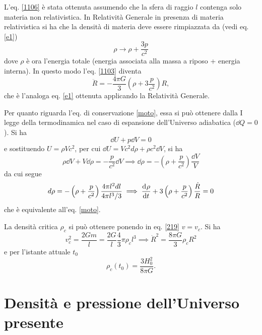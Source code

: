 L'eq. \eqref{1106} è stata ottenuta assumendo che la sfera di raggio $l$
contenga solo materia non relativistica.  In Relatività Generale in presenza di
materia relativistica si ha che la densità di materia deve essere rimpiazzata da
(vedi eq. \eqref{e1})
\begin{equation}
  \rho \to  \rho + \frac{3 p}{c^2}
\end{equation}
dove $\rho$ è ora l'energia totale (energia associata alla massa a riposo +
energia interna).  In questo modo l'eq. \eqref{1103} diventa
\begin{equation}
  \ddot R = - \frac{4 \pi G }{3} \left( \rho + 3 \frac{p}{c^2} \right) R,
\end{equation}
che è l'analoga eq. \eqref{e1} ottenuta applicando la Relatività Generale.

Per quanto riguarda l'eq. di conservazione \eqref{moto}, essa si può ottenere
dalla I legge della termodinamica nel caso di espansione dell'Universo
adiabatica ($\dd Q=0$).  Si ha
\begin{equation}
  \dd U + p \dd V=0
\end{equation}
e sostituendo $U=\rho V c^2$, per cui $\dd U= V c^2 d\rho + \rho c^2 \dd V$, si
ha
\begin{equation}
  \rho \dd V + V \dd\rho = - \frac{p}{c^2} \dd V \implies
  \dd\rho= -\left( \rho + \frac{p}{c^2} \right) \frac{\dd V}{V}
\end{equation}
da cui segue
\begin{equation}
  \label{eq:continuita}
  d\rho= - \left( \rho + \frac{p}{c^2} \right) \frac{4 \pi l^2 dl}{4 \pi l^3/3}
  \implies \frac{{\mathop{}\!\mathrm{d}^{}}\rho}{\mathop{}\!\mathrm{d} {t}^{}} +  3 \left( \rho + \frac{p}{c^2} \right) \frac{\dot
    R }{R} =0
\end{equation}
che è equivalente all'eq. \eqref{moto}.

La densità critica $\rho_c$ si può ottenere ponendo in eq. \eqref{219}
$v=v_{c}$.  Si ha
\begin{equation}
  v^2_{c} = \frac{2 G m }{l}=\frac{2G}{l} \frac{4}{3} \pi \rho_c l^3 \implies
  \dot{R}^2= \frac{8 \pi G}{3} \rho_c R^2
\end{equation}
e per l'istante attuale $t_0$
\begin{equation}
\rho_c(t_{0}) = \frac{3 H_0^2}{8 \pi G}.
\end{equation}

\section{Densità e pressione dell'Universo presente}

